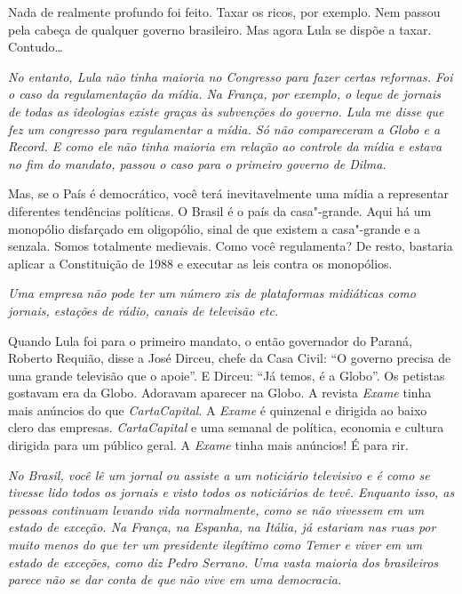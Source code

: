 \normalfont
Nada de realmente profundo foi feito. Taxar os ricos, por
exemplo. Nem passou pela cabeça de qualquer governo brasileiro. Mas
agora Lula se dispõe a taxar. Contudo…

\itshape
 No entanto, Lula não tinha maioria no Congresso para
fazer certas reformas. Foi o caso da regulamentação da mídia. Na França,
por exemplo, o leque de jornais de todas as ideologias existe graças às
subvenções do governo. Lula me disse que fez um congresso para
regulamentar a mídia. Só não compareceram a Globo e a Record. E como ele
não tinha maioria em relação ao controle da mídia e estava no fim do
mandato, passou o caso para o primeiro governo de Dilma.

\normalfont
Mas, se o País é democrático, você terá inevitavelmente
uma mídia a representar diferentes tendências políticas. O Brasil é o
país da casa"-grande. Aqui há um monopólio disfarçado em oligopólio,
sinal de que existem a casa"-grande e a senzala. Somos totalmente
medievais. Como você regulamenta? De resto, bastaria aplicar a
Constituição de 1988 e executar as leis contra os monopólios.

\itshape
 Uma empresa não pode ter um número xis de plataformas
midiáticas como jornais, estações de rádio, canais de televisão etc.

\normalfont
Quando Lula foi para o primeiro mandato, o então
governador do Paraná, Roberto Requião, disse a José Dirceu, chefe da
Casa Civil: ``O governo precisa de uma grande televisão que o apoie''. E
Dirceu: ``Já temos, é a Globo''. Os petistas gostavam era da Globo.
Adoravam aparecer na Globo. A revista \emph{Exame} tinha mais anúncios
do que \emph{CartaCapital}. A \emph{Exame} é quinzenal e dirigida ao
baixo clero das empresas. \emph{CartaCapital} e uma semanal de política,
economia e cultura dirigida para um público geral. A \emph{Exame} tinha
mais anúncios! É para rir.

\itshape
 No Brasil, você lê um jornal ou assiste a um noticiário
televisivo e é como se tivesse lido todos os jornais e visto todos os
noticiários de tevê. Enquanto isso, as pessoas continuam levando vida
normalmente, como se não vivessem em um estado de exceção. Na França, na
Espanha, na Itália, já estariam nas ruas por muito menos do que ter um
presidente ilegítimo como Temer e viver em um estado de exceções, como
diz Pedro Serrano. Uma vasta maioria dos brasileiros parece não se dar
conta de que não vive em uma democracia.

